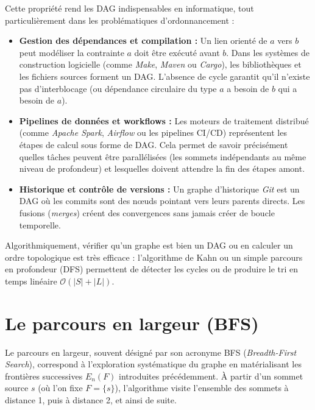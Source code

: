 \documentclass[11pt,a4paper]{report}
\begin{document}
	Cette propriété rend les DAG indispensables en informatique, tout particulièrement dans les problématiques d'ordonnancement :
	
	\begin{itemize}
		\item \textbf{Gestion des dépendances et compilation :} Un lien orienté de $a$ vers $b$ peut modéliser la contrainte \og{}$a$ doit être exécuté avant $b$\fg{}. Dans les systèmes de construction logicielle (comme \textit{Make}, \textit{Maven} ou \textit{Cargo}), les bibliothèques et les fichiers sources forment un DAG. L'absence de cycle garantit qu'il n'existe pas d'interblocage (ou dépendance circulaire du type \og{}$a$ a besoin de $b$ qui a besoin de $a$\fg{}).
		\item \textbf{Pipelines de données et workflows :} Les moteurs de traitement distribué (comme \textit{Apache Spark}, \textit{Airflow} ou les pipelines CI/CD) représentent les étapes de calcul sous forme de DAG. Cela permet de savoir précisément quelles tâches peuvent être parallélisées (les sommets indépendants au même niveau de profondeur) et lesquelles doivent attendre la fin des étapes amont.
		\item \textbf{Historique et contrôle de versions :} Un graphe d'historique \textit{Git} est un DAG où les commits sont des nœuds pointant vers leurs parents directs. Les fusions (\textit{merges}) créent des convergences sans jamais créer de boucle temporelle.
	\end{itemize}
	
	\vspace{0.5cm}
	Algorithmiquement, vérifier qu'un graphe est bien un DAG ou en calculer un ordre topologique est très efficace : l'algorithme de Kahn ou un simple parcours en profondeur (DFS) permettent de détecter les cycles ou de produire le tri en temps linéaire $\mathcal{O}(|S| + |L|)$.
	
	
	\section{Le parcours en largeur (BFS)}
	
	Le parcours en largeur, souvent désigné par son acronyme BFS (\textit{Breadth-First Search}), correspond à l'exploration systématique du graphe en matérialisant les frontières successives $E_n(F)$ introduites précédemment. À partir d'un sommet source $s$ (où l'on fixe $F = \{s\}$), l'algorithme visite l'ensemble des sommets à distance 1, puis à distance 2, et ainsi de suite.
	
\end{document}
